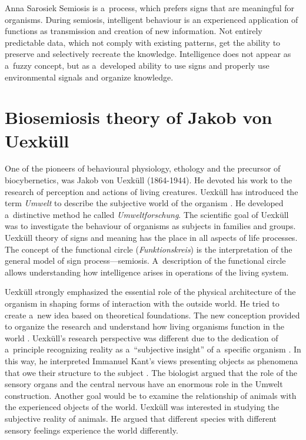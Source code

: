 \begin{artengenv}{Anna Sarosiek}
Semiosis is a~process, which prefers signs that are meaningful for organisms. During semiosis, intelligent behaviour is an experienced application of functions as transmission and creation of new information. Not entirely predictable data, which not comply with existing patterns, get the ability to preserve and selectively recreate the knowledge. Intelligence does not appear as a~fuzzy concept, but as a~developed ability to use signs and properly use environmental signals and organize knowledge.

\section*{Biosemiosis theory of Jakob von Uexküll}
One of the pioneers of behavioural physiology, ethology and the precursor of biocybernetics, was Jakob von Uexküll (1864-1944). He devoted his work to the research of perception and actions of living creatures. Uexküll has introduced the term \textit{Umwelt} to describe the subjective world of the organism
\parencite[][]{uexkull_umwelt_1921}. %
 He developed a~distinctive method he called \textit{Umweltforschung}. The scientific goal of Uexküll was to investigate the behaviour of organisms as subjects in families and groups. Uexküll theory of signs and meaning has the place in all aspects of life processes. The concept of the functional circle (\textit{Funktionskreis}) is the interpretation of the general model of sign process---semiosis. A~description of the functional circle allows understanding how intelligence arises in operations of the living system.

Uexküll strongly emphasized the essential role of the physical architecture of the organism in shaping forms of interaction with the outside world. He tried to create a~new idea based on theoretical foundations. The new conception provided to organize the research and understand how living organisms function in the world
\parencite[][p.7]{uexkull_theoretische_1920}. %
 Uexküll’s research perspective was different due to the dedication of a~principle recognizing reality as a~``subjective insight'' of a~specific organism 
\parencite[][p.9]{uexkull_theoretische_1920}. %
 In this way, he interpreted Immanuel Kant’s views presenting objects as phenomena that owe their structure to the subject 
\parencite[][p.8]{uexkull_theoretische_1920}. %
 The biologist argued that the role of the sensory organs and the central nervous have an enormous role in the Umwelt construction. Another goal would be to examine the relationship of animals with the experienced objects of the world. Uexküll was interested in studying the subjective reality of animals. He argued that different species with different sensory feelings experience the world differently.


\end{artengenv}
